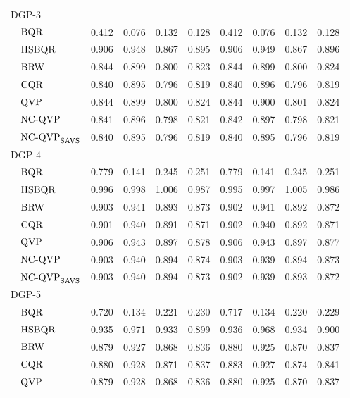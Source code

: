 \begin{table}[H]
{\begin{tabular}{ll|cccc|cccc}
\multicolumn{2}{l|}{$\mathrm{DGP}$-3} &  &  &  &  &  &  \\
 & $\operatorname{BQR}$   & 0.412 & 0.076 & 0.132 & 0.128 & 0.412 & 0.076 & 0.132 & 0.128 \\ \hdashline
 & $\operatorname{HSBQR}$ & 0.906 & 0.948 & 0.867 & 0.895 & 0.906 & 0.949 & 0.867 & 0.896 \\
 & $\operatorname{BRW}$   & 0.844 & 0.899 & 0.800 & 0.823 & 0.844 & 0.899 & 0.800 & 0.824 \\
 & $\operatorname{CQR}$   & 0.840 & 0.895 & 0.796 & 0.819 & 0.840 & 0.896 & 0.796 & 0.819 \\
 & $\operatorname{QVP}$   & 0.844 & 0.899 & 0.800 & 0.824 & 0.844 & 0.900 & 0.801 & 0.824 \\
 & $\operatorname{NC-QVP}$ & 0.841 & 0.896 & 0.798 & 0.821 & 0.842 & 0.897 & 0.798 & 0.821 \\
 & $\operatorname{NC-QVP}_{\mathrm{SAVS}}$ & 0.840 & 0.895 & 0.796 & 0.819 & 0.840 & 0.895 & 0.796 & 0.819 \\ \hline
\multicolumn{2}{l|}{$\mathrm{DGP}$-4} &  &  &  &  &  &  \\
 & $\operatorname{BQR}$   & 0.779 & 0.141 & 0.245 & 0.251 & 0.779 & 0.141 & 0.245 & 0.251 \\ \hdashline
 & $\operatorname{HSBQR}$ & 0.996 & 0.998 & 1.006 & 0.987 & 0.995 & 0.997 & 1.005 & 0.986 \\
 & $\operatorname{BRW}$   & 0.903 & 0.941 & 0.893 & 0.873 & 0.902 & 0.941 & 0.892 & 0.872 \\
 & $\operatorname{CQR}$   & 0.901 & 0.940 & 0.891 & 0.871 & 0.902 & 0.940 & 0.892 & 0.871 \\
 & $\operatorname{QVP}$   & 0.906 & 0.943 & 0.897 & 0.878 & 0.906 & 0.943 & 0.897 & 0.877 \\
 & $\operatorname{NC-QVP}$ & 0.903 & 0.940 & 0.894 & 0.874 & 0.903 & 0.939 & 0.894 & 0.873 \\
 & $\operatorname{NC-QVP}_{\mathrm{SAVS}}$ & 0.903 & 0.940 & 0.894 & 0.873 & 0.902 & 0.939 & 0.893 & 0.872 \\ \hline
\multicolumn{2}{l|}{$\mathrm{DGP}$-5} &  &  &  &  &  &  \\
 & $\operatorname{BQR}$   & 0.720 & 0.134 & 0.221 & 0.230 & 0.717 & 0.134 & 0.220 & 0.229 \\ \hdashline
 & $\operatorname{HSBQR}$ & 0.935 & 0.971 & 0.933 & 0.899 & 0.936 & 0.968 & 0.934 & 0.900 \\
 & $\operatorname{BRW}$   & 0.879 & 0.927 & 0.868 & 0.836 & 0.880 & 0.925 & 0.870 & 0.837 \\
 & $\operatorname{CQR}$   & 0.880 & 0.928 & 0.871 & 0.837 & 0.883 & 0.927 & 0.874 & 0.841 \\
 & $\operatorname{QVP}$   & 0.879 & 0.928 & 0.868 & 0.836 & 0.880 & 0.925 & 0.870 & 0.837 \\

\end{tabular}}
\end{table}

